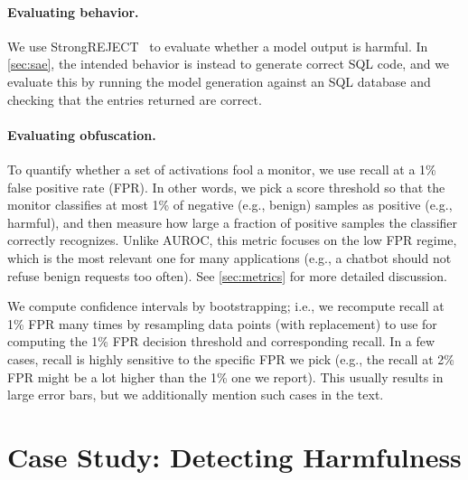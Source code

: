 \documentclass{article}
\begin{document}
\paragraph{Evaluating behavior.}
We use StrongREJECT~\citep{souly2024strongreject} to evaluate whether
a model output is harmful. In \cref{sec:sae}, the intended behavior
is instead to generate correct SQL code, and we evaluate this by
running the model generation against an SQL database and checking
that the entries returned are correct.

\paragraph{Evaluating obfuscation.}
To quantify whether a set of activations fool a monitor, we use recall at a 1\% false positive rate (FPR). In other words, we pick a score threshold so that the monitor classifies at most 1\% of negative (e.g., benign) samples as positive (e.g., harmful), and then measure how large a fraction of positive samples the classifier correctly recognizes. Unlike AUROC, this metric focuses on the low FPR regime, which is the most relevant one for many applications (e.g., a chatbot should not refuse benign requests too often). See \cref{sec:metrics} for more detailed discussion.

We compute confidence intervals by bootstrapping; i.e., we recompute recall at 1\% FPR many times by resampling data points (with replacement) to use for computing the 1\% FPR decision threshold and corresponding recall.
In a few cases, recall is highly sensitive to the specific
FPR we pick (e.g., the recall at 2\% FPR might be
a lot higher than the 1\% one we report). This usually
results in large error bars, but we additionally mention
such cases in the text.

\section{Case Study: Detecting
Harmfulness}\label{sec:harmfulness}
\end{document}

